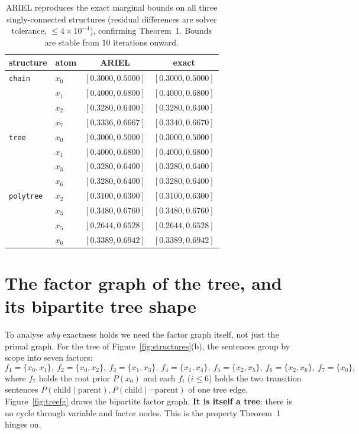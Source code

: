 \documentclass[11pt]{article}
\begin{document}
\begin{table}[ht]\centering\small
\begin{tabular}{llcc}
\toprule
structure & atom & ARIEL & exact \\
\midrule
\texttt{chain}    & $x_0$ & $[0.3000,0.5000]$ & $[0.3000,0.5000]$ \\
                  & $x_1$ & $[0.4000,0.6800]$ & $[0.4000,0.6800]$ \\
                  & $x_2$ & $[0.3280,0.6400]$ & $[0.3280,0.6400]$ \\
                  & $x_7$ & $[0.3336,0.6667]$ & $[0.3340,0.6670]$ \\
\midrule
\texttt{tree}     & $x_0$ & $[0.3000,0.5000]$ & $[0.3000,0.5000]$ \\
                  & $x_1$ & $[0.4000,0.6800]$ & $[0.4000,0.6800]$ \\
                  & $x_3$ & $[0.3280,0.6400]$ & $[0.3280,0.6400]$ \\
                  & $x_6$ & $[0.3280,0.6400]$ & $[0.3280,0.6400]$ \\
\midrule
\texttt{polytree} & $x_2$ & $[0.3100,0.6300]$ & $[0.3100,0.6300]$ \\
                  & $x_3$ & $[0.3480,0.6760]$ & $[0.3480,0.6760]$ \\
                  & $x_5$ & $[0.2644,0.6528]$ & $[0.2644,0.6528]$ \\
                  & $x_6$ & $[0.3389,0.6942]$ & $[0.3389,0.6942]$ \\
\bottomrule
\end{tabular}
\caption{ARIEL reproduces the exact marginal bounds on all three singly-connected structures
  (residual differences are solver tolerance, $\le 4\times10^{-4}$), confirming Theorem~1. Bounds
  are stable from $10$ iterations onward.}
\label{tab:fixed}
\end{table}

\section{The factor graph of the tree, and its bipartite tree shape}\label{sec:treefg}

To analyse \emph{why} exactness holds we need the factor graph itself, not just the primal graph.
For the tree of Figure~\ref{fig:structures}(b), the sentences group by scope into seven factors:
\[
  f_1{=}\{x_0,x_1\},\ f_2{=}\{x_0,x_2\},\ f_3{=}\{x_1,x_3\},\ f_4{=}\{x_1,x_4\},\
  f_5{=}\{x_2,x_5\},\ f_6{=}\{x_2,x_6\},\ f_7{=}\{x_0\},
\]
where $f_7$ holds the root prior $P(x_0)$ and each $f_i$ ($i\le 6$) holds the two transition
sentences $P(\text{child}\mid\text{parent}),P(\text{child}\mid\neg\text{parent})$ of one tree edge.
Figure~\ref{fig:treefg} draws the bipartite factor graph. \textbf{It is itself a tree}: there is no
cycle through variable and factor nodes. This is the property Theorem~1 hinges on.
\end{document}
